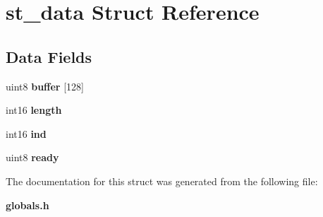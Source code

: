 \section{st\+\_\+data Struct Reference}
\label{structst__data}
\subsection*{Data Fields}
\begin{DoxyCompactItemize}
\item 
\mbox{\label{structst__data_ae690fc5f3d08456a861f43937912613d}} 
uint8 {\bfseries buffer} [128]
\item 
\mbox{\label{structst__data_a3fb0e45fa764ccedd2dd8c0654c2e743}} 
int16 {\bfseries length}
\item 
\mbox{\label{structst__data_a5d76dba8ca72d027d149ffcf8760f2ca}} 
int16 {\bfseries ind}
\item 
\mbox{\label{structst__data_ac24f07ab21d61d7af9cb3a49d102e0ac}} 
uint8 {\bfseries ready}
\end{DoxyCompactItemize}


The documentation for this struct was generated from the following file\+:\begin{DoxyCompactItemize}
\item 
\textbf{ globals.\+h}\end{DoxyCompactItemize}
